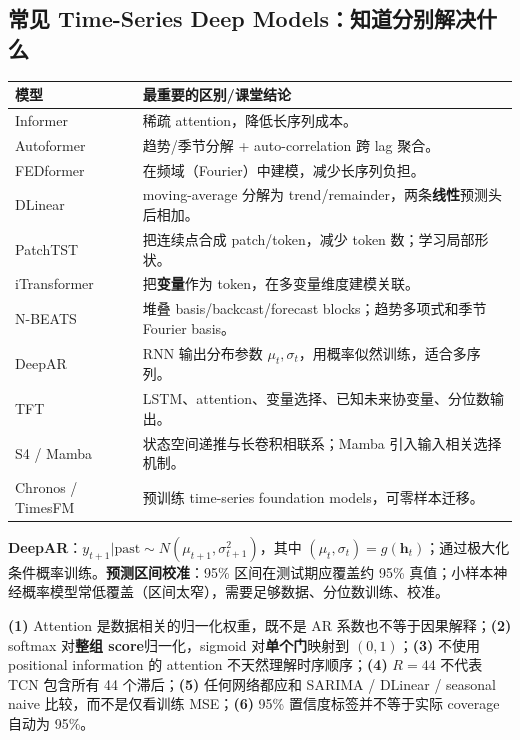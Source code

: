\documentclass[UTF8,fontset=fandol,10.5pt,a4paper]{ctexart}
\newcommand{\thick}{\renewcommand{\arraystretch}{1.18}}
\begin{document}
\subsection{常见 Time-Series Deep Models：知道分别解决什么}
\begin{center}\small\thick\begin{tabularx}{0.99\linewidth}{lX}
\toprule
模型 & 最重要的区别/课堂结论 \\\midrule
Informer & 稀疏 attention，降低长序列成本。\\
Autoformer & 趋势/季节分解 + auto-correlation 跨 lag 聚合。\\
FEDformer & 在频域（Fourier）中建模，减少长序列负担。\\
DLinear & moving-average 分解为 trend/remainder，两条\textbf{线性}预测头后相加。\\
PatchTST & 把连续点合成 patch/token，减少 token 数；学习局部形状。\\
iTransformer & 把\textbf{变量}作为 token，在多变量维度建模关联。\\
N-BEATS & 堆叠 basis/backcast/forecast blocks；趋势多项式和季节 Fourier basis。\\
DeepAR & RNN 输出分布参数 $\mu_t,\sigma_t$，用概率似然训练，适合多序列。\\
TFT & LSTM、attention、变量选择、已知未来协变量、分位数输出。\\
S4 / Mamba & 状态空间递推与长卷积相联系；Mamba 引入输入相关选择机制。\\
Chronos / TimesFM & 预训练 time-series foundation models，可零样本迁移。\\
\bottomrule\end{tabularx}\end{center}
\par\smallskip{}\par\smallskip
\par\smallskip{}\par\smallskip
\textbf{DeepAR}：$y_{t+1}|\text{past}\sim N(\mu_{t+1},\sigma_{t+1}^2)$，其中 $(\mu_t,\sigma_t)=g(\mathbf h_t)$；通过极大化条件概率训练。\textbf{预测区间校准}：95\% 区间在测试期应覆盖约 95\% 真值；小样本神经概率模型常低覆盖（区间太窄），需要足够数据、分位数训练、校准。
\begin{pitbox}
\textbf{(1)} Attention 是数据相关的归一化权重，既不是 AR 系数也不等于因果解释；\textbf{(2)} softmax 对\textbf{整组 score}归一化，sigmoid 对\textbf{单个门}映射到 $(0,1)$；\textbf{(3)} 不使用 positional information 的 attention 不天然理解时序顺序；\textbf{(4)} $R=44$ 不代表 TCN 包含所有 44 个滞后；\textbf{(5)} 任何网络都应和 SARIMA / DLinear / seasonal naive 比较，而不是仅看训练 MSE；\textbf{(6)} 95\% 置信度标签并不等于实际 coverage 自动为 95\%。
\end{pitbox}
\clearpage
\end{document}
